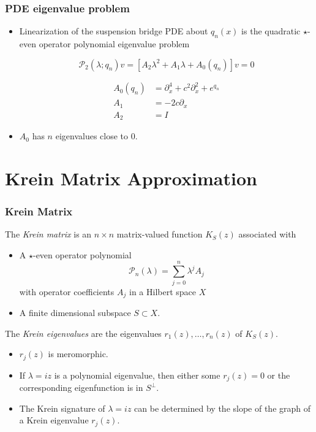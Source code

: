 \documentclass[16pt]{beamer}
\newcommand{\calP}{\mathcal{P}}
\begin{document}
\begin{frame}
\frametitle{PDE eigenvalue problem} 

	\begin{itemize}
	\item Linearization of the suspension bridge PDE about $q_n(x)$ is the quadratic $\star$-even operator polynomial eigenvalue problem

    \[ \calP_2(\lambda; q_n)v = [A_2 \lambda^2 + A_1 \lambda + A_0(q_n)]v = 0 \]

    \begin{align*}
    A_0(q_n) &= \partial_x^4 + c^2 \partial_x^2 + e^{q_n} \\
    A_1 &= -2 c \partial_x \\
    A_2 &= I
    \end{align*}

    \item $A_0$ has $n$ eigenvalues close to 0.
	\end{itemize}
\end{frame}

\section{Krein Matrix Approximation}

\begin{frame}
\frametitle{Krein Matrix}
\begin{definition}[Kapitula et. al., 2019]
    The \emph{Krein matrix} is an $n \times n$ matrix-valued function $K_S(z)$ associated with 
    \begin{itemize}
    	\item A $\star$-even operator polynomial 
    	\[
    	\calP_n(\lambda) = \sum_{j=0}^n \lambda^j A_j
    	\] 
    	with operator coefficients $A_j$ in a Hilbert space $X$
    	\item A finite dimensional subspace $S \subset X$.
    \end{itemize}

    The \emph{Krein eigenvalues} are the eigenvalues $r_1(z), \dots, r_n(z)$ of $K_S(z)$.
    \begin{itemize}
      \item $r_j(z)$ is meromorphic.
      \item If $\lambda = iz$ is a polynomial eigenvalue, then 
      either some $r_j(z) = 0$ or the corresponding eigenfunction is in $S^\perp$.
      \item The Krein signature of $\lambda = i z$ can be determined by the slope of the graph of a Krein eigenvalue $r_j(z)$.
    \end{itemize}
\end{definition}
\end{frame}
\end{document}
